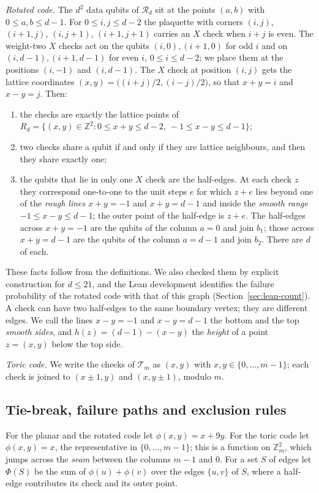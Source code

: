 \documentclass[11pt]{amsart}
\theoremstyle{definition}
\theoremstyle{remark}
\numberwithin{equation}{section}
\begin{document}
\emph{Rotated code.} The $d^2$ data qubits of $\mathcal R_d$ sit at the points $(a,b)$ with $0\le a,b\le d-1$. For
$0\le i,j\le d-2$ the plaquette with corners $(i,j)$, $(i+1,j)$, $(i,j+1)$, $(i+1,j+1)$ carries an $X$ check when
$i+j$ is even. The weight-two $X$ checks act on the qubits $(i,0),(i+1,0)$ for odd $i$ and on $(i,d-1),(i+1,d-1)$ for
even $i$, $0\le i\le d-2$; we place them at the positions $(i,-1)$ and $(i,d-1)$. The $X$ check at position $(i,j)$
gets the lattice coordinates $(x,y)=\bigl((i+j)/2,(i-j)/2\bigr)$, so that $x+y=i$ and $x-y=j$. Then:
\begin{enumerate}[label=(\alph*),leftmargin=2em]
\item the checks are exactly the lattice points of $R_d=\{(x,y)\in\mathbb Z^2: 0\le x+y\le d-2,\ -1\le x-y\le d-1\}$;
\item two checks share a qubit if and only if they are lattice neighbours, and then they share exactly one;
\item the qubits that lie in only one $X$ check are the half-edges. At each check $z$ they correspond one-to-one to the
  unit steps $e$ for which $z+e$ lies beyond one of the \emph{rough lines} $x+y=-1$ and $x+y=d-1$ and inside the
  \emph{smooth range} $-1\le x-y\le d-1$; the outer point of the half-edge is $z+e$. The half-edges across $x+y=-1$
  are the qubits of the column $a=0$ and join $b_1$; those across $x+y=d-1$ are the qubits of the column $a=d-1$ and
  join $b_2$. There are $d$ of each.
\end{enumerate}
These facts follow from the definitions. We also checked them by explicit construction for $d\le21$, and the Lean
development identifies the failure probability of the rotated code with that of this graph
(Section~\ref{sec:lean-count}). A check can have two half-edges to the same boundary vertex; they are different
edges. We call the lines $x-y=-1$ and $x-y=d-1$ the bottom and the top \emph{smooth sides}, and
$h(z)=(d-1)-(x-y)$ the \emph{height} of a point $z=(x,y)$ below the top side.

\emph{Toric code.} We write the checks of $\mathcal T_m$ as $(x,y)$ with $x,y\in\{0,\dots,m-1\}$; each check is
joined to $(x\pm1,y)$ and $(x,y\pm1)$, modulo $m$.

\subsection{Tie-break, failure paths and exclusion rules}\label{cnt:rules}
For the planar and the rotated code let $\phi(x,y)=x+9y$. For the toric code let $\phi(x,y)=x$, the representative in
$\{0,\dots,m-1\}$; this is a function on $\mathbb Z_m^2$, which jumps across the \emph{seam} between the columns $m-1$
and $0$. For a set $S$ of edges let $\Phi(S)$ be the sum of $\phi(u)+\phi(v)$ over the edges $\{u,v\}$ of $S$, where a
half-edge contributes its check and its outer point.
\end{document}
